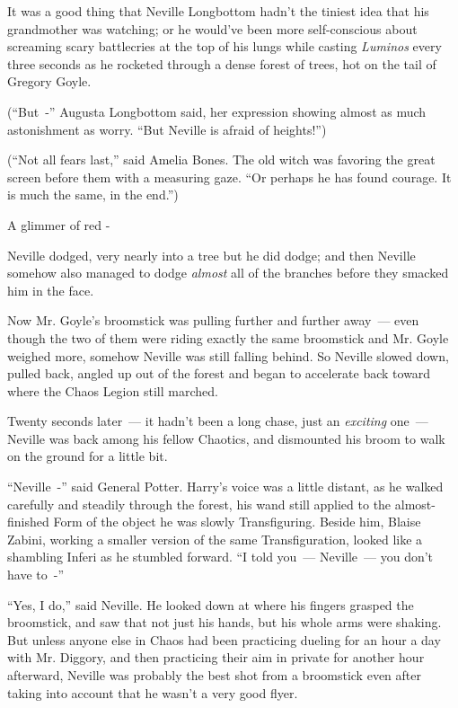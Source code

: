 It was a good thing that Neville Longbottom hadn't the tiniest idea that his grandmother was watching; or he would've been more self-conscious about screaming scary battlecries at the top of his lungs while casting \emph{Luminos} every three seconds as he rocketed through a dense forest of trees, hot on the tail of Gregory Goyle.

(``But~-'' Augusta Longbottom said, her expression showing almost as much astonishment as worry. ``But Neville is afraid of heights!'')

(``Not all fears last,'' said Amelia Bones. The old witch was favoring the great screen before them with a measuring gaze. ``Or perhaps he has found courage. It is much the same, in the end.'')

A glimmer of red -

Neville dodged, very nearly into a tree but he did dodge; and then Neville somehow also managed to dodge \emph{almost} all of the branches before they smacked him in the face.

Now Mr. Goyle's broomstick was pulling further and further away~--- even though the two of them were riding exactly the same broomstick and Mr. Goyle weighed more, somehow Neville was still falling behind. So Neville slowed down, pulled back, angled up out of the forest and began to accelerate back toward where the Chaos Legion still marched.

Twenty seconds later~--- it hadn't been a long chase, just an \emph{exciting} one~--- Neville was back among his fellow Chaotics, and dismounted his broom to walk on the ground for a little bit.

``Neville~-'' said General Potter. Harry's voice was a little distant, as he walked carefully and steadily through the forest, his wand still applied to the almost-finished Form of the object he was slowly Transfiguring. Beside him, Blaise Zabini, working a smaller version of the same Transfiguration, looked like a shambling Inferi as he stumbled forward. ``I told you~--- Neville~--- you don't have to~-''

``Yes, I do,'' said Neville. He looked down at where his fingers grasped the broomstick, and saw that not just his hands, but his whole arms were shaking. But unless anyone else in Chaos had been practicing dueling for an hour a day with Mr. Diggory, and then practicing their aim in private for another hour afterward, Neville was probably the best shot from a broomstick even after taking into account that he wasn't a very good flyer.

